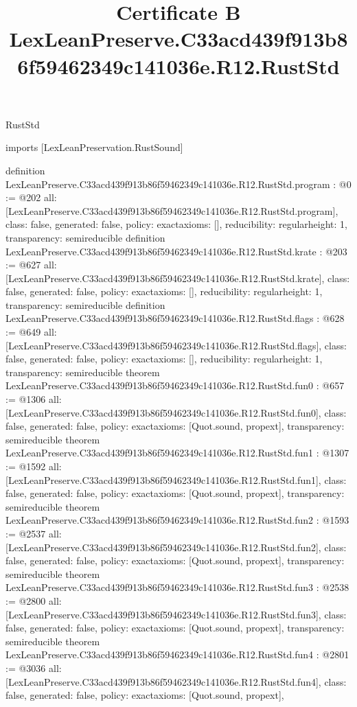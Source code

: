 \begin{lexlean}{RustStd}
\title{Certificate B LexLeanPreserve.C33acd439f913b86f59462349c141036e.R12.RustStd}
\begin{coremodule}
imports [LexLeanPreservation.RustSound]

definition LexLeanPreserve.C33acd439f913b86f59462349c141036e.R12.RustStd.program : @0 := @202 {
  all: [LexLeanPreserve.C33acd439f913b86f59462349c141036e.R12.RustStd.program],
  class: false,
  generated: false,
  policy: exact{axioms: []},
  reducibility: regular{height: 1},
  transparency: semireducible
}
definition LexLeanPreserve.C33acd439f913b86f59462349c141036e.R12.RustStd.krate : @203 := @627 {
  all: [LexLeanPreserve.C33acd439f913b86f59462349c141036e.R12.RustStd.krate],
  class: false,
  generated: false,
  policy: exact{axioms: []},
  reducibility: regular{height: 1},
  transparency: semireducible
}
definition LexLeanPreserve.C33acd439f913b86f59462349c141036e.R12.RustStd.flags : @628 := @649 {
  all: [LexLeanPreserve.C33acd439f913b86f59462349c141036e.R12.RustStd.flags],
  class: false,
  generated: false,
  policy: exact{axioms: []},
  reducibility: regular{height: 1},
  transparency: semireducible
}
theorem LexLeanPreserve.C33acd439f913b86f59462349c141036e.R12.RustStd.fun0 : @657 := @1306 {
  all: [LexLeanPreserve.C33acd439f913b86f59462349c141036e.R12.RustStd.fun0],
  class: false,
  generated: false,
  policy: exact{axioms: [Quot.sound, propext]},
  transparency: semireducible
}
theorem LexLeanPreserve.C33acd439f913b86f59462349c141036e.R12.RustStd.fun1 : @1307 := @1592 {
  all: [LexLeanPreserve.C33acd439f913b86f59462349c141036e.R12.RustStd.fun1],
  class: false,
  generated: false,
  policy: exact{axioms: [Quot.sound, propext]},
  transparency: semireducible
}
theorem LexLeanPreserve.C33acd439f913b86f59462349c141036e.R12.RustStd.fun2 : @1593 := @2537 {
  all: [LexLeanPreserve.C33acd439f913b86f59462349c141036e.R12.RustStd.fun2],
  class: false,
  generated: false,
  policy: exact{axioms: [Quot.sound, propext]},
  transparency: semireducible
}
theorem LexLeanPreserve.C33acd439f913b86f59462349c141036e.R12.RustStd.fun3 : @2538 := @2800 {
  all: [LexLeanPreserve.C33acd439f913b86f59462349c141036e.R12.RustStd.fun3],
  class: false,
  generated: false,
  policy: exact{axioms: [Quot.sound, propext]},
  transparency: semireducible
}
theorem LexLeanPreserve.C33acd439f913b86f59462349c141036e.R12.RustStd.fun4 : @2801 := @3036 {
  all: [LexLeanPreserve.C33acd439f913b86f59462349c141036e.R12.RustStd.fun4],
  class: false,
  generated: false,
  policy: exact{axioms: [Quot.sound, propext]},
}
\end{coremodule}
\end{lexlean}
